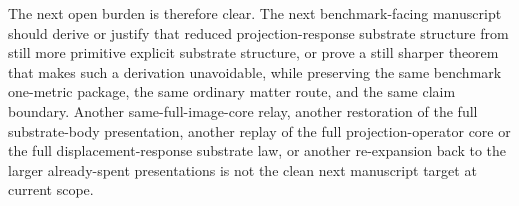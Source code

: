 \documentclass[11pt]{article}
\begin{document}
The next open burden is therefore clear. The next benchmark-facing manuscript should derive or justify that reduced projection-response substrate structure from still more primitive explicit substrate structure, or prove a still sharper theorem that makes such a derivation unavoidable, while preserving the same benchmark one-metric package, the same ordinary matter route, and the same claim boundary. Another same-full-image-core relay, another restoration of the full substrate-body presentation, another replay of the full projection-operator core or the full displacement-response substrate law, or another re-expansion back to the larger already-spent presentations is not the clean next manuscript target at current scope.
\end{document}
